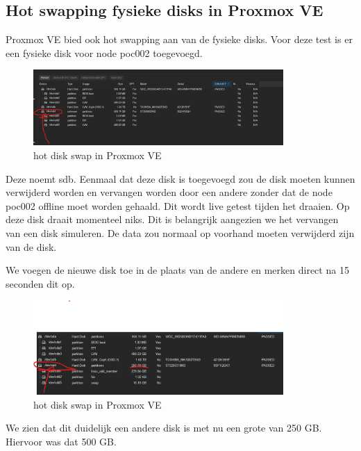 \subsection{Hot swapping fysieke disks in Proxmox VE}
Proxmox VE bied ook hot swapping aan van de fysieke disks. 
Voor deze test is er een fysieke disk voor node poc002 toegevoegd.
\begin{figure}[H]
  \centering
  \includegraphics[width=0.85\textwidth]{../poc/hot-disk-prox.png}
  \caption{hot disk swap in Proxmox VE}
  \label{fig:hotdisk-swap}
\end{figure}
Deze noemt sdb. Eenmaal dat deze disk is toegevoegd zou de disk moeten kunnen verwijderd worden en vervangen worden door een andere zonder dat de node poc002 offline moet worden gehaald.
Dit wordt live getest tijden het draaien. Op deze disk draait momenteel niks. Dit is belangrijk aangezien we het vervangen van een disk simuleren. De data zou normaal op voorhand moeten verwijderd zijn van de disk.

We voegen de nieuwe disk toe in de plaats van de andere en merken direct na 15 seconden dit op.
\begin{figure}[H]
  \centering
  \includegraphics[width=0.85\textwidth]{../poc/hot-disktwee-prox.png}
  \caption{hot disk swap in Proxmox VE}
  \label{fig:hotdiskvervangen-swap}
\end{figure}

We zien dat dit duidelijk een andere disk is met nu een grote van 250 GB. Hiervoor was dat 500 GB.